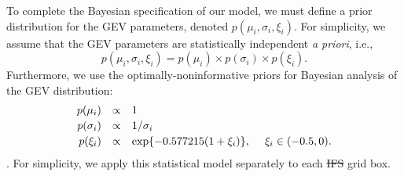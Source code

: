 \documentclass{article}
\newcommand{\bg}{\boldsymbol{g}}
\newcommand{\bh}{\boldsymbol{h}}
\begin{document}
To complete the Bayesian specification of our model, we must define a prior distribution for the GEV parameters, denoted $p(\mu_i, \sigma_i, \xi_i)$.
For simplicity, we assume that the GEV parameters are statistically independent \textit{a priori}, i.e., 
\[
p(\mu_i, \sigma_i, \xi_i) = p(\mu_i) \times p( \sigma_i) \times p( \xi_i).
\]
Furthermore, we use the optimally-noninformative priors for Bayesian analysis of the GEV distribution:
\begin{equation} \label{eq_priors}
    \begin{array}{rcl}
        p(\mu_i) & \propto & 1 \\[0.5ex]
        p(\sigma_i) & \propto & 1/\sigma_i \\[0.5ex]
        p(\xi_i) & \propto & \exp\{-0.577215(1+\xi_i)\}, \hskip3ex \xi_i \in (-0.5, 0).
    \end{array}
\end{equation}
\citep{Zhang2024}.  For simplicity, we apply this statistical model separately to each \st{IFS}  grid box.
\end{document}

